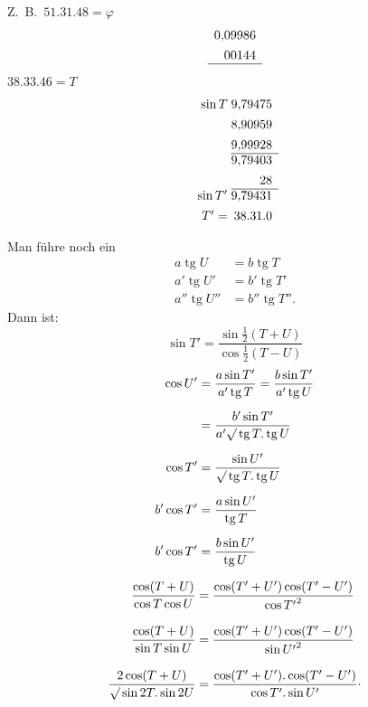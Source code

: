 \clearpage{}
\noindent\begin{minipage}[t]{.33\linewidth}
\noindent Z.\ B.\ \(51.31.48=\varphi\)
\[\begin{array}{r}
0{,}09986\\[.4em]
00144\\\hline
\end{array}\]
\noindent \(38.33.46=T\)
\[\begin{array}{r@{\;}r}
\sin T&9{,}79475\\[.4em]
&8{,}90959\\[.4em]
&9{,}99928\\\cline{2-2}
&9{,}79403\\[.4em]
&28\\\cline{2-2}
\sin T'&9{,}79431\\[.4em]
T'=&38.31.0
\end{array}\]
\end{minipage}\hfill\vrule\hfill\begin{minipage}[t]{.62\linewidth}
\noindent Man führe noch ein
\[\begin{aligned}
a\operatorname{tg}U&=b\operatorname{tg}T\\[.4em]
a'\operatorname{tg}U'&=b'\operatorname{tg}T'\\[.4em]
a''\operatorname{tg}U''&=b''\operatorname{tg}T''.
\end{aligned}\]
\noindent Dann ist:
\[\sin T'=\frac{\sin\frac12(T+U)}{\cos\frac12(T-U)}\]
{\small
\[\begin{aligned}
\cos U'&=\frac{a\sin T'}{a'\operatorname{tg}T}=\frac{b\sin T'}{a'\operatorname{tg}U}\\[.6em]
&=\frac{b'\sin T'}{a'\surd\operatorname{tg}T.\operatorname{tg}U}\\[.6em]
\cos T'&=\frac{\sin U'}{\surd\operatorname{tg}T.\operatorname{tg}U}\\[.6em]
b'\cos T'&=\frac{a\sin U'}{\operatorname{tg}T}\\[.6em]
b'\cos T'&=\frac{b\sin U'}{\operatorname{tg}U}
\end{aligned}\]}
\end{minipage}
\[\begin{aligned}
\frac{\cos(T+U)}{\cos T\cos U}&=\frac{\cos(T'+U')\cos(T'-U')}{\cos{T'}^2}\\[.9em]
\frac{\cos(T+U)}{\sin T\sin U}&=\frac{\cos(T'+U')\cos(T'-U')}{\sin{U'}^2}\\[.9em]
\frac{2\cos(T+U)}{\surd\sin2T.\sin2U}&=\frac{\cos(T'+U').\cos(T'-U')}{\cos T'.\sin U'}\mathpunct{\raisebox{.5ex}{.}}
\end{aligned}\]
\clearpage\endgroup
